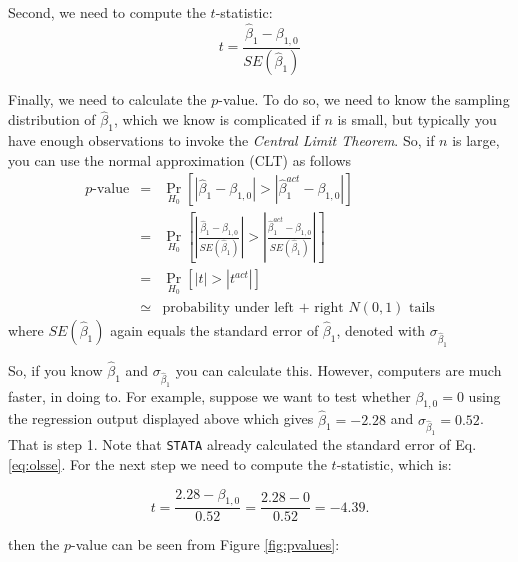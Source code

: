 \documentclass[
]{book}
\begin{document}
Second, we need to compute the \(t\)-statistic:
\begin{equation}
t = \frac{\hat{\beta}_1 - \beta_{1,0}}{SE(\hat{\beta}_1)}
\label{eq:olst}
\end{equation}

Finally, we need to calculate the \(p\)-value. To do so, we need to know the sampling distribution of \(\hat{\beta}_1\), which we know is complicated if \(n\) is small, but typically you have enough observations to invoke the \emph{Central Limit Theorem}. So, if \(n\) is large, you can use the normal approximation (CLT) as follows
\begin{eqnarray}
                        p\text{-value}& = &   \Pr_{H_0}\left[\left|\hat{\beta}_1 - \beta_{1,0}\right| > \left|\hat{\beta}_1^{act} - \beta_{1,0}\right|\right]\\
            & = &   \Pr_{H_0}\left[\left|\frac{\hat{\beta}_1 - \beta_{1,0}}{SE(\hat{\beta}_1)}\right| > \left|\frac{\hat{\beta}_1 ^{act} - \beta_{1,0}}{SE(\hat{\beta}_1)}\right|\right]\\
            & = &   \Pr_{H_0}[|t| > |t^{act}|]\\
                        &\simeq& \text{probability under left + right } N(0,1) \text{ tails}
\end{eqnarray}
where \(SE(\hat{\beta}_1)\) again equals the standard error of \(\hat{\beta}_1\), denoted with \(\sigma_{\hat{\beta}_1}\)

So, if you know \(\hat{\beta}_1\) and \(\sigma_{\hat{\beta}_1}\) you can calculate this. However, computers are much faster, in doing to. For example, suppose we want to test whether \(\beta_{1,0} = 0\) using the regression output displayed above which gives \(\hat{\beta}_1 = -2.28\) and \(\sigma_{\hat{\beta}_1} = 0.52\). That is step 1. Note that \texttt{STATA} already calculated the standard error of Eq. \eqref{eq:olsse}. For the next step we need to compute the \(t\)-statistic, which is:

\begin{equation}
t = \frac{2.28 - \beta_{1,0}}{0.52} = \frac{2.28 - 0}{0.52} = -4.39.
\label{eq:olstemp}
\end{equation}

then the \(p\)-value can be seen from Figure \ref{fig:pvalues}:
\end{document}
